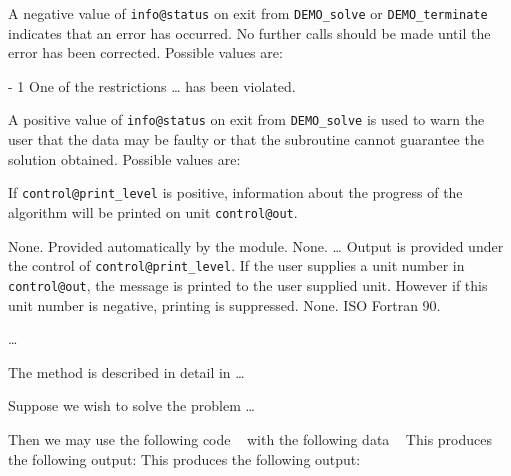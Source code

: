 \documentclass{galahad}
\newcommand{\packagename}{DEMO}
\begin{document}

\galerrors
A negative value of {\tt info@status} on exit from 
{\tt \packagename\_solve}
or 
{\tt \packagename\_terminate}
indicates that an error has occurred. No further calls should be made
until the error has been corrected. Possible values are:

\begin{description}
\item{- 1 } One of the restrictions \ldots
          has been violated.
\end{description}
A positive value of {\tt info@status} on exit from 
{\tt \packagename\_solve}
is used to warn the user that the data may be faulty or that 
the subroutine cannot guarantee the solution obtained.
Possible values are:



\galinfo
If {\tt control@print\_level} is positive, information about the progress 
of the algorithm will be printed on unit {\tt control@out}.


\galgeneral

\galcommon None.
\galworkspace Provided automatically by the module.
\galroutines None. 
\galmodules \ldots
\galio Output is provided under the control of {\tt control@print\_level}.
     If the user supplies a unit number in {\tt control@out}, the message
     is printed to the user supplied unit. However if this unit
     number is negative, printing is suppressed.
\galrestrictions None.
\galportability ISO Fortran 90.


\galmethod
\ldots

\galreference
The method is described in detail in \ldots


\galexample
Suppose we wish to solve the problem \ldots

\noindent
Then we may use the following code
{\tt \small
\VerbatimInput{\packageexample}
}
\noindent
with the following data
{\tt \small
\VerbatimInput{\packagedata}
}
\noindent
This produces the following output:
This produces the following output:
{\tt \small
\VerbatimInput{\packageresults}
}
\noindent
\end{document}
